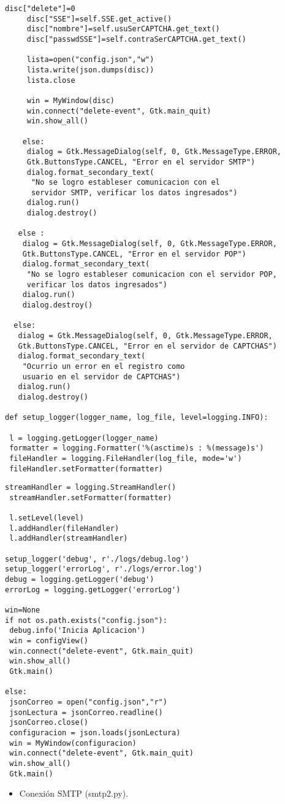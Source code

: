 \begin{lstlisting}[frame=single]
     disc["delete"]=0
     disc["SSE"]=self.SSE.get_active()
     disc["nombre"]=self.usuSerCAPTCHA.get_text()
     disc["passwdSSE"]=self.contraSerCAPTCHA.get_text()
     
     lista=open("config.json","w")   
     lista.write(json.dumps(disc))
     lista.close
     
     win = MyWindow(disc)
     win.connect("delete-event", Gtk.main_quit)
     win.show_all()
     
    else:
     dialog = Gtk.MessageDialog(self, 0, Gtk.MessageType.ERROR,
     Gtk.ButtonsType.CANCEL, "Error en el servidor SMTP")
     dialog.format_secondary_text(
      "No se logro estableser comunicacion con el 
      servidor SMTP, verificar los datos ingresados")
     dialog.run()
     dialog.destroy()
     
   else :
    dialog = Gtk.MessageDialog(self, 0, Gtk.MessageType.ERROR,
    Gtk.ButtonsType.CANCEL, "Error en el servidor POP")
    dialog.format_secondary_text(
     "No se logro estableser comunicacion con el servidor POP, 
     verificar los datos ingresados")
    dialog.run()
    dialog.destroy()
    
  else:
   dialog = Gtk.MessageDialog(self, 0, Gtk.MessageType.ERROR,
   Gtk.ButtonsType.CANCEL, "Error en el servidor de CAPTCHAS")
   dialog.format_secondary_text(
    "Ocurrio un error en el registro como 
    usuario en el servidor de CAPTCHAS")
   dialog.run()
   dialog.destroy()
   
def setup_logger(logger_name, log_file, level=logging.INFO):

 l = logging.getLogger(logger_name)
 formatter = logging.Formatter('%(asctime)s : %(message)s')
 fileHandler = logging.FileHandler(log_file, mode='w')
 fileHandler.setFormatter(formatter)
\end{lstlisting}
\begin{lstlisting}[frame=single]
 streamHandler = logging.StreamHandler()
 streamHandler.setFormatter(formatter)

 l.setLevel(level)
 l.addHandler(fileHandler)
 l.addHandler(streamHandler) 

setup_logger('debug', r'./logs/debug.log')
setup_logger('errorLog', r'./logs/error.log')
debug = logging.getLogger('debug')
errorLog = logging.getLogger('errorLog')

win=None
if not os.path.exists("config.json"):
 debug.info('Inicia Aplicacion')
 win = configView()
 win.connect("delete-event", Gtk.main_quit)
 win.show_all()
 Gtk.main()

else:
 jsonCorreo = open("config.json","r")
 jsonLectura = jsonCorreo.readline()
 jsonCorreo.close()
 configuracion = json.loads(jsonLectura)
 win = MyWindow(configuracion)
 win.connect("delete-event", Gtk.main_quit)  
 win.show_all()
 Gtk.main()

\end{lstlisting}
\begin{itemize}
\item Conexión SMTP (smtp2.py).
\end{itemize}

